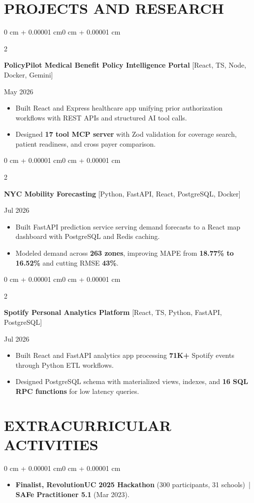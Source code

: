 \documentclass[10pt, letterpaper]{article}
\newenvironment{highlights}{
    \begin{itemize}[
        topsep=0.10 cm,
        parsep=0.06 cm,
        partopsep=0pt,
        itemsep=0.06 cm,
        leftmargin=12pt
    ]
}{
    \end{itemize}
}
\newenvironment{onecolentry}{
    \begin{adjustwidth}{0 cm + 0.00001 cm}{0 cm + 0.00001 cm}
}{
    \end{adjustwidth}
}
\newenvironment{twocolentry}[2][]{
    \onecolentry
    \def\secondColumn{#2}
    \setcolumnwidth{\fill, 4.5 cm}
    \begin{paracol}{2}
}{
    \switchcolumn \raggedleft \secondColumn
    \end{paracol}
    \endonecolentry
}
\begin{document}
\section{PROJECTS AND RESEARCH}
\begin{twocolentry}{May 2026}
\textbf{PolicyPilot Medical Benefit Policy Intelligence Portal} [React, TS, Node, Docker, Gemini]
\end{twocolentry}
\begin{highlights}
  \item Built React and Express healthcare app unifying prior authorization workflows with REST APIs and structured AI tool calls.
  \item Designed \textbf{17 tool MCP server} with Zod validation for coverage search, patient readiness, and cross payer comparison.
\end{highlights}

\vspace{0.12 cm}

\begin{twocolentry}{Jul 2026}
\textbf{NYC Mobility Forecasting} [Python, FastAPI, React, PostgreSQL, Docker]
\end{twocolentry}
\begin{highlights}
  \item Built FastAPI prediction service serving demand forecasts to a React map dashboard with PostgreSQL and Redis caching.
  \item Modeled demand across \textbf{263 zones}, improving MAPE from \textbf{18.77\% to 16.52\%} and cutting RMSE \textbf{43\%}.
\end{highlights}

\vspace{0.12 cm}

\begin{twocolentry}{Jul 2026}
\textbf{Spotify Personal Analytics Platform} [React, TS, Python, FastAPI, PostgreSQL]
\end{twocolentry}
\begin{highlights}
  \item Built React and FastAPI analytics app processing \textbf{71K+} Spotify events through Python ETL workflows.
  \item Designed PostgreSQL schema with materialized views, indexes, and \textbf{16 SQL RPC functions} for low latency queries.
\end{highlights}

\section{EXTRACURRICULAR ACTIVITIES}
\begin{onecolentry}
\begin{highlights}
  \item \textbf{Finalist, RevolutionUC 2025 Hackathon} (300 participants, 31 schools) \,|\, \textbf{SAFe Practitioner 5.1} (Mar 2023).
\end{highlights}
\end{onecolentry}
\end{document}
